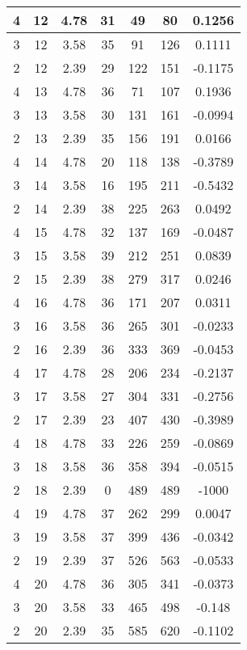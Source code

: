 \documentclass[letterpaper, 12pt]{article}
\begin{document}
\begin{longtable}{|c|c|c|c|c|c|c|}
\hline
4 & 12 & 4.78 & 31 & 49 & 80 & 0.1256 \\
\hline
3 & 12 & 3.58 & 35 & 91 & 126 & 0.1111 \\
\hline
2 & 12 & 2.39 & 29 & 122 & 151 & -0.1175 \\
\hline
4 & 13 & 4.78 & 36 & 71 & 107 & 0.1936 \\
\hline
3 & 13 & 3.58 & 30 & 131 & 161 & -0.0994 \\
\hline
2 & 13 & 2.39 & 35 & 156 & 191 & 0.0166 \\
\hline
4 & 14 & 4.78 & 20 & 118 & 138 & -0.3789 \\
\hline
3 & 14 & 3.58 & 16 & 195 & 211 & -0.5432 \\
\hline
2 & 14 & 2.39 & 38 & 225 & 263 & 0.0492 \\
\hline
4 & 15 & 4.78 & 32 & 137 & 169 & -0.0487 \\
\hline
3 & 15 & 3.58 & 39 & 212 & 251 & 0.0839 \\
\hline
2 & 15 & 2.39 & 38 & 279 & 317 & 0.0246 \\
\hline
4 & 16 & 4.78 & 36 & 171 & 207 & 0.0311 \\
\hline
3 & 16 & 3.58 & 36 & 265 & 301 & -0.0233 \\
\hline
2 & 16 & 2.39 & 36 & 333 & 369 & -0.0453 \\
\hline
4 & 17 & 4.78 & 28 & 206 & 234 & -0.2137 \\
\hline
3 & 17 & 3.58 & 27 & 304 & 331 & -0.2756 \\
\hline
2 & 17 & 2.39 & 23 & 407 & 430 & -0.3989 \\
\hline
4 & 18 & 4.78 & 33 & 226 & 259 & -0.0869 \\
\hline
3 & 18 & 3.58 & 36 & 358 & 394 & -0.0515 \\
\hline
2 & 18 & 2.39 & 0 & 489 & 489 & -1000 \\
\hline
4 & 19 & 4.78 & 37 & 262 & 299 & 0.0047 \\
\hline
3 & 19 & 3.58 & 37 & 399 & 436 & -0.0342 \\
\hline
2 & 19 & 2.39 & 37 & 526 & 563 & -0.0533 \\
\hline
4 & 20 & 4.78 & 36 & 305 & 341 & -0.0373 \\
\hline
3 & 20 & 3.58 & 33 & 465 & 498 & -0.148 \\
\hline
2 & 20 & 2.39 & 35 & 585 & 620 & -0.1102 \\
\hline
\end{longtable}
\end{document}
